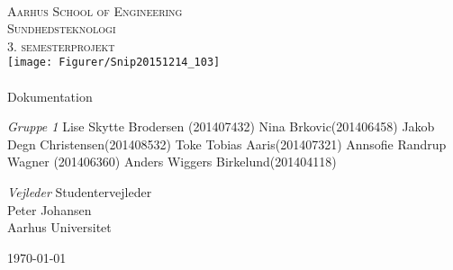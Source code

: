 \begin{titlingpage}
\begin{center}

~ \\[2cm]

\textsc{\LARGE Aarhus School of Engineering}\\[1cm]

\textsc{\Large Sundhedsteknologi}\\
\textsc{\Large 3. semesterprojekt}\\[1cm]

\texttt{[image: Figurer/Snip20151214\_103]}\\[1cm]



\noindent\makebox[\linewidth]{\rule{\textwidth}{0.4pt}}\\
[0.5cm]{\Huge Dokumentation}
\noindent\makebox[\linewidth]{\rule{\textwidth}{0.4pt}}

\end{center}

\textit{Gruppe 1} \newline
Lise Skytte Brodersen (201407432) \newline
Nina Brkovic(201406458) \newline
Jakob Degn Christensen(201408532) \newline
Toke Tobias Aaris(201407321) \newline		 
Annsofie Randrup Wagner (201406360) \newline 
Anders Wiggers Birkelund(201404118) \newline



\textit{Vejleder} \newline
Studentervejleder\\
Peter Johansen\\
Aarhus Universitet


\vfill

\begin{center}
{\large \today}
\end{center}


\end{titlingpage}